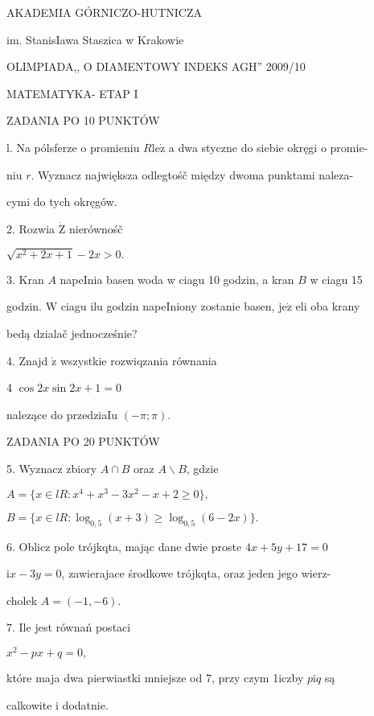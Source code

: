 \documentclass[a4paper,12pt]{article}
\begin{document}
AKADEMIA GÓRNICZO-HUTNICZA

im. StanisIawa Staszica w Krakowie

OLIMPIADA,, O DIAMENTOWY INDEKS AGH'' 2009/10

MATEMATYKA- ETAP I

ZADANIA PO 10 PUNKTÓW

l. Na pólsferze o promieniu $R\mathrm{l}\mathrm{e}\dot{\mathrm{z}}$ a dwa styczne do siebie okręgi o promie-

niu $r$. Wyznacz największa odlegtośč między dwoma punktami naleza-

cymi do tych okręgów.

2. Rozwia $\dot{\mathrm{Z}}$ nierównośč

$\sqrt{x^{2}+2x+1}-2x>0.$

3. Kran $A$ napeInia basen woda w ciagu 10 godzin, a kran $B$ w ciagu 15

godzin. $\mathrm{W}$ ciagu ilu godzin napeIniony zostanie basen, $\mathrm{j}\mathrm{e}\dot{\mathrm{z}}$ eli oba krany

bedą dzialač jednocześnie?

4. Znajd $\acute{\mathrm{z}}$ wszystkie rozwiqzania równania

4 $\cos 2x\sin 2x+1=0$

nalezące do przedziaIu $(-\pi;\pi).$

ZADANIA PO 20 PUNKTÓW

5. Wyznacz zbiory $A\cap B$ oraz $A\backslash B$, gdzie

$A=\{x\in lR:x^{4}+x^{3}-3x^{2}-x+2\geq 0\},$

$B=\{x\in lR:\log_{0,5}(x+3)\geq\log_{0,5}(6-2x)\}.$

6. Oblicz pole trójkqta, mając dane dwie proste $4x+5y+17 = 0$

$\mathrm{i} x-3y=0$, zawierajace środkowe trójkqta, oraz jeden jego wierz-

cholek $A=(-1,-6).$

7. Ile jest równań postaci

$x^{2}-px+q=0,$

które maja dwa pierwiastki mniejsze od 7, przy czym 1iczby $p\mathrm{i}q$ są

calkowite i dodatnie.
\end{document}
